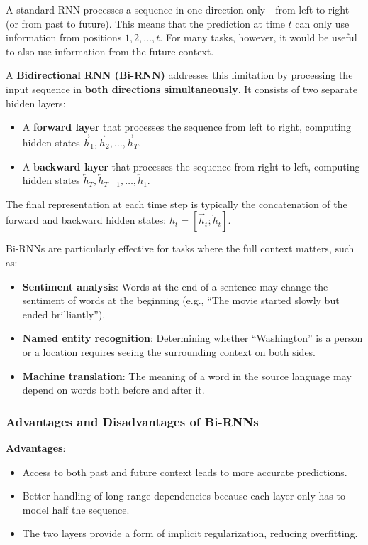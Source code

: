 \documentclass[11pt,a4paper]{article}
\begin{document}
A standard RNN processes a sequence in one direction only---from left to right (or from past to future). This means that the prediction at time $t$ can only use information from positions $1, 2, \ldots, t$. For many tasks, however, it would be useful to also use information from the future context.

A \textbf{Bidirectional RNN (Bi-RNN)} addresses this limitation by processing the input sequence in \textbf{both directions simultaneously}. It consists of two separate hidden layers:
\begin{itemize}
    \item A \textbf{forward layer} that processes the sequence from left to right, computing hidden states $\overrightarrow{h}_1, \overrightarrow{h}_2, \ldots, \overrightarrow{h}_T$.
    \item A \textbf{backward layer} that processes the sequence from right to left, computing hidden states $\overleftarrow{h}_T, \overleftarrow{h}_{T-1}, \ldots, \overleftarrow{h}_1$.
\end{itemize}

The final representation at each time step is typically the concatenation of the forward and backward hidden states: $h_t = [\overrightarrow{h}_t; \overleftarrow{h}_t]$.

Bi-RNNs are particularly effective for tasks where the full context matters, such as:
\begin{itemize}
    \item \textbf{Sentiment analysis}: Words at the end of a sentence may change the sentiment of words at the beginning (e.g., ``The movie started slowly but ended brilliantly'').
    \item \textbf{Named entity recognition}: Determining whether ``Washington'' is a person or a location requires seeing the surrounding context on both sides.
    \item \textbf{Machine translation}: The meaning of a word in the source language may depend on words both before and after it.
\end{itemize}

\subsubsection{Advantages and Disadvantages of Bi-RNNs}

\textbf{Advantages}:
\begin{itemize}
    \item Access to both past and future context leads to more accurate predictions.
    \item Better handling of long-range dependencies because each layer only has to model half the sequence.
    \item The two layers provide a form of implicit regularization, reducing overfitting.
\end{itemize}
\end{document}
